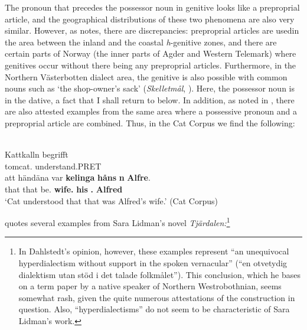 The pronoun that precedes the possessor noun in genitive looks like a preproprial article, and the geographical distributions of these two phenomena are also very similar. However, as \citet[67]{Delsing2003b} notes, there are discrepancies: preproprial articles are used\textstyleLinguisticExample{ }in the area between the inland and the coastal \textit{h}{}-genitive zones, and there are certain parts of Norway (the inner parts of Agder and Western Telemark) where genitives occur without there being any preproprial articles. Furthermore, in the Northern Västerbotten dialect area, the genitive is also possible with common nouns such as  ‘the shop-owner’s sack’ (\textit{Skelletmål}, \citealt[23]{Marklund1976}). Here, the possessor noun is in the dative, a fact that I shall return to below. In addition, as noted in \citet{HolmbergEtAl2003}, there are also attested examples from the same area where a possessive pronoun and a preproprial article are combined. Thus, in the Cat Corpus we find the following:

\ea%
\\
\gll Kattkalln  begrifft\\
tomcat.{}  understand.PRET\\
\gll att  händäna  var  \textbf{kelinga} \textbf{håns} \textbf{n} \textbf{Alfre}.\\
that  that  be.{\pst}  \textbf{wife.{}} \textbf{his} \textbf{{\pda}.{\m}} \textbf{Alfred}\\
\glt  ‘Cat understood that that was Alfred’s wife.’ (Cat Corpus)
\z

\citet[51]{Dahlstedt1971} quotes several examples from Sara Lidman’s novel \textit{Tjärdalen}\textit{:}\footnote{ In Dahlstedt’s opinion, however, these examples represent “an unequivocal hyperdialectism without support in the spoken vernacular” (“en otvetydig dialektism utan stöd i det talade folkmålet”). This conclusion, which he bases on a term paper by a native speaker of Northern Westrobothnian, seems somewhat rash, given the quite numerous attestations of the construction in question. Also, “hyperdialectisms” do not seem to be characteristic of Sara Lidman’s work.\par }


